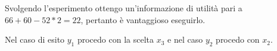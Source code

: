 \documentclass[\main/main.tex]{subfiles}
\begin{document}
\begin{figure}
\end{figure}

Svolgendo l'esperimento ottengo un'informazione di utilità pari a $66+60-52*2 = 22$, pertanto è vantaggioso eseguirlo.

Nel caso di esito $y_1$ procedo con la scelta $x_3$ e nel caso $y_2$ procedo con $x_2$.
\end{document}

